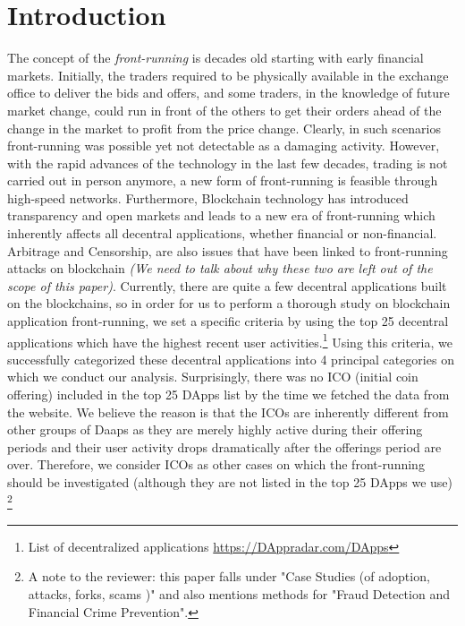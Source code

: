 \section{Introduction}

\label{sec:intro}


The concept of the \emph{front-running} is decades old starting with early financial markets. Initially, the traders required to be physically available in the exchange office to deliver the bids and offers, and some traders, in the knowledge of future market change, could run in front of the others to get their orders ahead of the change in the market to profit from the price change. Clearly, in such scenarios front-running was possible yet not detectable as a damaging activity. However, with the rapid advances of the technology in the last few decades, trading is not carried out in person anymore, a new form of front-running is feasible through high-speed networks. Furthermore, Blockchain technology has introduced transparency and open markets and leads to a new era of front-running which inherently affects all decentral applications, whether financial or non-financial. Arbitrage and Censorship, are also issues that have been linked to front-running attacks on blockchain \textit{(We need to talk about why these two are left out of the scope of this paper)}. Currently, there are quite a few decentral applications built on the blockchains, so in order for us to perform a thorough study on blockchain application front-running, we set a specific criteria by using the top 25 decentral applications which have the highest recent user activities.\footnote{List of decentralized applications \url{https://DAppradar.com/DApps}} Using this criteria, we successfully categorized these decentral applications into 4 principal categories on which we conduct our analysis. Surprisingly, there was no ICO (initial coin offering) included in the top 25 DApps list by the time we fetched the data from the website. We believe the reason is that the ICOs are inherently different from other groups of Daaps as they are merely highly active during their offering periods and their user activity drops dramatically after the offerings period are over. Therefore, we  consider ICOs as other cases on which the front-running should be investigated (although they are not listed in the top 25 DApps we use) \footnote{A note to the reviewer: this paper falls under "Case Studies (\eg of adoption, attacks, forks, scams \etc)" and also mentions methods for "Fraud Detection and Financial Crime Prevention".}



